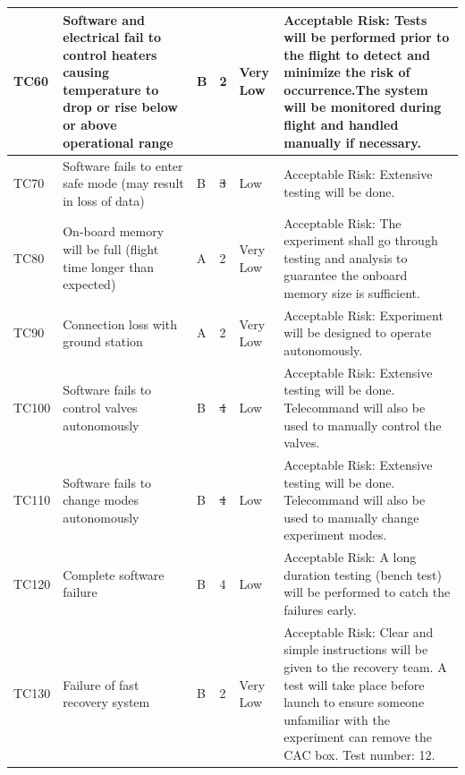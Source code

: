 \documentclass[a4paper,12pt,twoside]{article}
\providecommand{\DIFaddtex}[1]{{\protect\color{blue}\uwave{#1}}} %
\providecommand{\DIFdeltex}[1]{{\protect\color{red}\sout{#1}}}                      %
\providecommand{\DIFaddbegin}{} %
\providecommand{\DIFaddend}{} %
\providecommand{\DIFdelbegin}{} %
\providecommand{\DIFdelend}{} %
\providecommand{\DIFadd}[1]{\texorpdfstring{\DIFaddtex{#1}}{#1}} %
\providecommand{\DIFdel}[1]{\texorpdfstring{\DIFdeltex{#1}}{}} %
\newcommand{\DIFscaledelfig}{0.5}
\newlength{\DIFdelgraphicswidth} %
\newlength{\DIFdelgraphicsheight} %
\newcommand{\DIFaddincludegraphics}[2][]{{\color{blue}\fbox{\DIFOincludegraphics[#1]{#2}}}} %
\newcommand{\DIFdelincludegraphics}[2][]{%
\sbox{\DIFdelgraphicsbox}{\DIFOincludegraphics[#1]{#2}}%
\settoboxwidth{\DIFdelgraphicswidth}{\DIFdelgraphicsbox} %
\settoboxtotalheight{\DIFdelgraphicsheight}{\DIFdelgraphicsbox} %
\scalebox{\DIFscaledelfig}{%
\parbox[b]{\DIFdelgraphicswidth}{\usebox{\DIFdelgraphicsbox}\\[-\baselineskip] \rule{\DIFdelgraphicswidth}{0em}}\llap{\resizebox{\DIFdelgraphicswidth}{\DIFdelgraphicsheight}{%
\setlength{\unitlength}{\DIFdelgraphicswidth}%
\begin{picture}(1,1)%
\thicklines\linethickness{2pt} %
{\color[rgb]{1,0,0}\put(0,0){\framebox(1,1){}}}%
{\color[rgb]{1,0,0}\put(0,0){\line( 1,1){1}}}%
{\color[rgb]{1,0,0}\put(0,1){\line(1,-1){1}}}%
\end{picture}%
}\hspace*{3pt}}} %
} %
\DeclareRobustCommand{\DIFaddbegin}{\DIFOaddbegin \let\includegraphics\DIFaddincludegraphics} %
\DeclareRobustCommand{\DIFaddend}{\DIFOaddend \let\includegraphics\DIFOincludegraphics} %
\DeclareRobustCommand{\DIFdelbegin}{\DIFOdelbegin \let\includegraphics\DIFdelincludegraphics} %
\DeclareRobustCommand{\DIFdelend}{\DIFOaddend \let\includegraphics\DIFOincludegraphics} %
\begin{document}
\begin{landscape}
\begin{longtable}{|m{}| m{} |m{} |m{}|m{}| m{}|}
TC60 & Software and electrical fail to control heaters causing temperature to drop or rise below or above operational range & B & 2 & \cellcolor[HTML]{34FF34}Very Low & Acceptable Risk: Tests will be performed prior to the flight to detect and minimize the risk of occurrence.The system will be monitored during flight and handled manually if necessary. \\ \hline
TC70 & Software fails to enter safe mode (may result in loss of data) & B & \DIFdelbegin \DIFdel{3 }\DIFdelend \DIFaddbegin \DIFadd{1 }\DIFaddend & \DIFdelbegin %
\DIFdelend \DIFaddbegin \cellcolor[HTML]{34FF34}\DIFadd{Very }\DIFaddend Low & Acceptable Risk: Extensive testing will be done. \\ \hline
TC80 & On-board memory will be full (flight time longer than expected) & A & 2 & \cellcolor[HTML]{34FF34}Very Low & Acceptable Risk: The experiment shall go through testing and analysis to guarantee the onboard memory size is sufficient.\\ \hline
TC90 & Connection loss with ground station & A & 2 & \cellcolor[HTML]{34FF34}Very Low & Acceptable Risk: Experiment will be designed to operate autonomously. \\ \hline
TC100 & Software fails to control valves autonomously & B & \DIFdelbegin \DIFdel{4 }\DIFdelend \DIFaddbegin \DIFadd{2 }\DIFaddend & \DIFdelbegin %
\DIFdelend \DIFaddbegin \cellcolor[HTML]{34FF34}\DIFadd{Very }\DIFaddend Low & Acceptable Risk: Extensive testing will be done. Telecommand will also be used to manually control the valves. \\ \hline
TC110 & Software fails to change modes autonomously & B & \DIFdelbegin \DIFdel{4 }\DIFdelend \DIFaddbegin \DIFadd{2 }\DIFaddend & \DIFdelbegin %
\DIFdelend \DIFaddbegin \cellcolor[HTML]{34FF34}\DIFadd{Very }\DIFaddend Low & Acceptable Risk: Extensive testing will be done. Telecommand will also be used to manually change experiment modes. \\ \hline
TC120 & Complete software failure & B & 4 & \cellcolor[HTML]{FCFF2F}Low & Acceptable Risk: A long duration testing (bench test) will be performed to catch the failures early. \\ \hline
TC130 & Failure of fast recovery system & B & 2 & \cellcolor[HTML]{34FF34}Very Low & Acceptable Risk: Clear and simple instructions will be given to the recovery team. A test will take place before launch to ensure someone unfamiliar with the experiment can remove the CAC box. Test number: 12. \\ \hline

\end{longtable}
\end{landscape}
\end{document}
